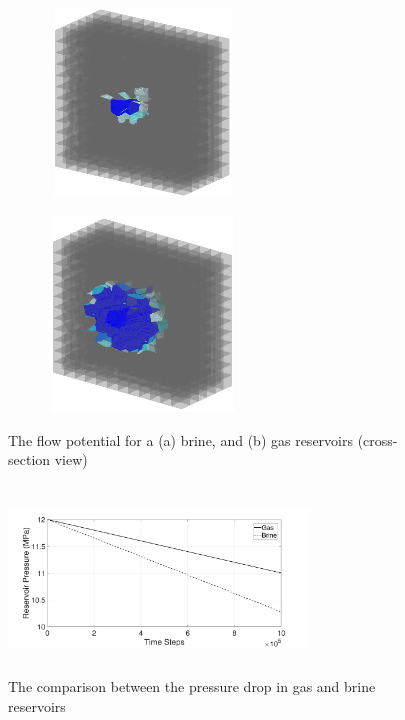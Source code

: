 \begin{figure}[!ht]
\begin{subfigure}[c]{0.48\textwidth}
\centering
\includegraphics[width=5cm,height=5cm]{figures/Amir_ME4_Brine_Flow.png}
\subcaption{}
\label{fig:Amir_ME4_Brine_Flow}
\end{subfigure}
\hfill
\begin{subfigure}[c]{0.48\textwidth}
\centering
\includegraphics[width=5cm,height=5.2cm]{figures/Amir_ME4_Gas_Flow.png}
\subcaption{}
\label{fig:Amir_ME4_Gas_Flow}
\end{subfigure}
\caption{The flow potential for a (a) brine, and (b) gas reservoirs (cross-section view)}
\end{figure}

\begin{figure}[!ht]
\centering
\includegraphics[width=8cm,height=5cm]{figures/Amir_ME4_Pressure.png}
\caption{The comparison between the pressure drop in gas and brine reservoirs}
\label{fig:Amir_ME4_Pressure}
\end{figure}

